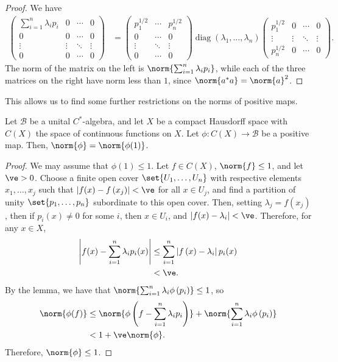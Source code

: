 \documentclass[10pt]{mypackage}
\begin{document}
\begin{proof}
  We have
  \begin{align*}
    \begin{pmatrix}\sum_{i=1}^{n}\lambda_ip_i & 0 & \cdots & 0 \\ 0 & 0 & \cdots & 0 \\ \vdots & \vdots & \ddots & \vdots \\ 0 & 0 & \cdots & 0\end{pmatrix} &= \begin{pmatrix}p_1^{1/2} & \cdots & p_n^{1/2}\\0 & \cdots & 0 \\ \vdots & \ddots & \vdots \\ 0 & \cdots & 0\end{pmatrix} \operatorname{diag}\left( \lambda_1,\dots,\lambda_n \right) \begin{pmatrix}p_1^{1/2} & 0 & \cdots & 0 \\ \vdots & \vdots & \ddots & \vdots \\ p_n^{1/2} & 0 & \cdots & 0\end{pmatrix}.
  \end{align*}
  The norm of the matrix on the left is $\norm{\sum_{i=1}^{n}\lambda_ip_i}$, while each of the three matrices on the right have norm less than $1$, since $\norm{a^{\ast}a} = \norm{a}^2$.
\end{proof}
This allows us to find some further restrictions on the norms of positive maps.
\begin{theorem}
  Let $\mathcal{B}$ be a unital $C^{\ast}$-algebra, and let $X$ be a compact Hausdorff space with $C(X)$ the space of continuous functions on $X$. Let $\phi\colon C(X)\rightarrow \mathcal{B}$ be a positive map. Then, $\norm{\phi} = \norm{\phi(1)}$.
\end{theorem}
\begin{proof}
  We may assume that $\phi(1)\leq 1$. Let $f\in C(X)$, $\norm{f}\leq 1$, and let $\ve > 0$. Choose a finite open cover $\set{U_1,\dots,U_n}$ with respective elements $x_1,\dots,x_j$ such that $\left\vert f(x) - f\left( x_j \right) \right\vert < \ve$ for all $x\in U_j$, and find a partition of unity $\set{p_1,\dots,p_n}$ subordinate to this open cover. Then, setting $\lambda_j = f\left( x_j \right)$, then if $p_i(x)\neq 0$ for some $i$, then $x\in U_i$, and $\left\vert f(x)-\lambda_i \right\vert < \ve$. Therefore, for any $x\in X$,
  \begin{align*}
    \left\vert f(x) - \sum_{i=1}^{n}\lambda_ip_i(x) \right\vert &\leq \sum_{i=1}^{n} \left\vert f\left( x \right)-\lambda_i \right\vert p_i(x)\\
                                                                &< \ve.
  \end{align*}
  By the lemma, we have that $\norm{\sum_{i=1}^{n}\lambda_i\phi\left( p_i \right)}\leq 1$, so
  \begin{align*}
    \norm{\phi(f)} &\leq \norm{\phi\left( f-\sum_{i=1}^{n}\lambda_ip_i \right)} + \norm{\sum_{i=1}^{n}\lambda_i\phi\left( p_i \right)}\\
                   &< 1 + \ve\norm{\phi}.
  \end{align*}
  Therefore, $\norm{\phi}\leq 1$.
\end{proof}
\end{document}

